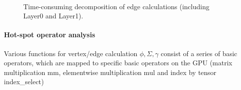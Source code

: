 \begin{figure}
	\centering
    \\
    \caption{Time-consuming decomposition of edge calculations (including Layer0 and Layer1).}
	\label{fig:exp_edge_calc_decomposition}
\end{figure}

\paragraph{Hot-spot operator analysis}
Various functions for vertex/edge calculation $\phi, \Sigma,\gamma$ consist of a series of basic operators,
which are mapped to specific basic operators on the GPU (matrix multiplication mm, elementwise multiplication mul and index by tensor index\_select)

